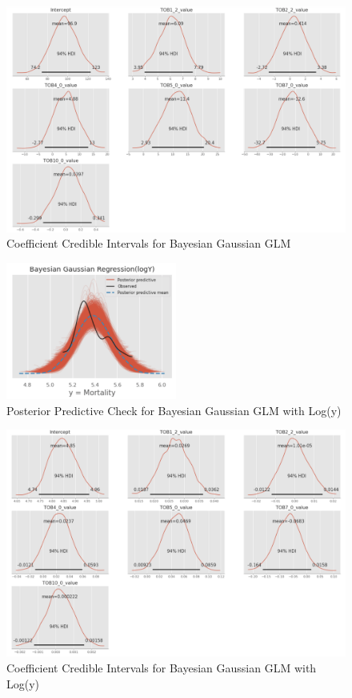 \documentclass{article}
\begin{document}
\begin{figure}
\centering
\includegraphics[width=1.0\textwidth]{gaussian_pos.png}
\caption{Coefficient Credible Intervals for Bayesian Gaussian GLM}
\label{fig:figure13}
\end{figure}

\begin{figure}
\centering
\includegraphics[width=0.5\textwidth]{gaussian_logy_ppc.png}
\caption{Posterior Predictive Check for Bayesian Gaussian GLM with Log(y)}
\label{fig:figure14}
\end{figure}

\begin{figure}
\centering
\includegraphics[width=1.0\textwidth]{gaussian_logy_pos.png}
\caption{Coefficient Credible Intervals for Bayesian Gaussian GLM with Log(y)}
\label{fig:figure15}
\end{figure}
\end{document}
